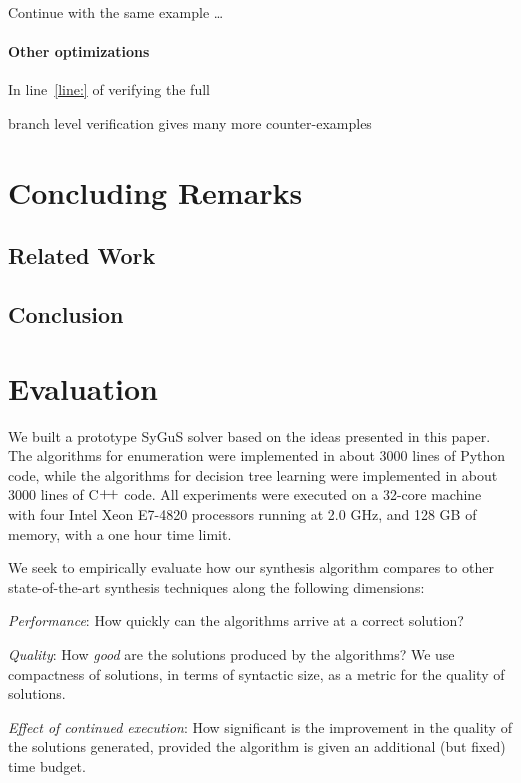 \documentclass{llncs}
\newcommand{\sygus}{{\sffamily\fontsize{8.5}{10}\selectfont
    SyGuS}\xspace}
\begin{document}
\begin{example}
  Continue with the same example \dots
\end{example}

\paragraph{Other optimizations}
In line~\ref{line:} of verifying the full

branch level verification gives many more counter-examples

\section{Concluding Remarks}
\label{sec:conclusion}

\subsection{Related Work}

\subsection{Conclusion}

\section{Evaluation}
\label{sec:evaluation}
% 



We built a prototype \sygus solver based on the ideas presented in
this paper. The algorithms for enumeration were implemented in
about 3000 lines of Python code, while the algorithms for decision
tree learning were implemented in about 3000 lines of
C$\raisebox{1pt}{+\!+}$ code. All experiments were executed on a
32-core machine with four Intel Xeon E7-4820 processors running at 2.0
GHz, and 128 GB of memory, with a one hour time limit.

We seek to empirically evaluate how our synthesis algorithm compares
to other state-of-the-art synthesis techniques along the following
dimensions:
\begin{inparaenum}[(a)]
\item
\emph{Performance}: How quickly can the algorithms arrive at a correct
solution?
\item
\emph{Quality}: How \emph{good} are the solutions produced by the
algorithms? We use compactness of solutions, in terms of syntactic
size, as a metric for the quality of solutions.
\item
\emph{Effect of continued execution}: How significant is the
improvement in the quality of the solutions generated, provided the
algorithm is given an additional (but fixed) time budget.
\end{inparaenum}
\end{document}
